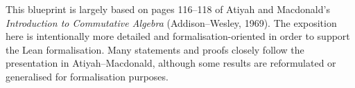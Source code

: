 %

This blueprint is largely based on pages 116--118 of Atiyah and Macdonald's \textit{Introduction to Commutative Algebra} (Addison--Wesley, 1969). The exposition here is intentionally more detailed and formalisation-oriented in order to support the Lean formalisation. Many statements and proofs closely follow the presentation in Atiyah--Macdonald, although some results are reformulated or generalised for formalisation purposes.


